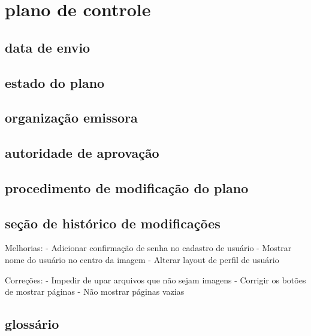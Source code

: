 \chapter{plano de controle}

\section{data de envio}

\section{estado do plano}

\section{organização emissora}

\section{autoridade de aprovação}

\section{procedimento de modificação do plano}

\section{seção de histórico de modificações}

Melhorias:
- Adicionar confirmação de senha no cadastro de usuário
- Mostrar nome do usuário no centro da imagem
- Alterar layout de perfil de usuário

Correções:
- Impedir de upar arquivos que não sejam imagens
- Corrigir os botões de mostrar páginas
- Não mostrar páginas vazias

\section{glossário}
